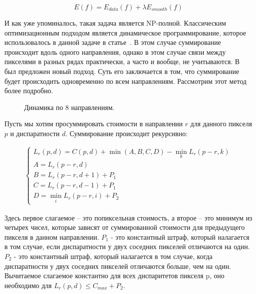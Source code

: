 \begin{equation}
\label{minimization}
E(f) = E_{data}(f) + \lambda  E_{smooth}(f)
\end{equation}

И как уже упоминалось, такая задача является NP-полной. Классическим
оптимизационным подходом является динамическое программирование, которое использовалось в данной задаче в статье~\cite{dp}. В этом случае
суммирование происходит вдоль одного направления, однако в этом случае связи между
пикселями в разных рядах практически, а часто и вообще, не учитываются. В \cite{sgm}  был
предложен новый подход. Суть его заключается в том, что суммирование будет происходить
одновременно по всем направлениям. Рассмотрим этот метод более подробно. 

\begin{figure}[h!]
\caption{Динамика по 8 направлениям.}
\label{pic:5}
\end{figure}

Пусть мы хотим просуммировать стоимости в направлении $r$ для данного пикселя $p$ и
диспаратности $d$. Суммирование происходит рекурсивно: 


\begin{align}
\label{minimization2}
\begin{cases}
L_r(p, d) = C(p, d) + \min (A, B, C, D) - \min\limits_{k}  L_r(p - r, k) \\
A = L_r(p - r, d) \\
B = L_r(p - r, d + 1) + P_1 \\
C = L_r(p - r, d - 1) + P_1 \\
D = \min_{i} L_r(p - r, i) + P_2 
\end{cases}
\end{align}

Здесь первое слагаемое – это попиксельная стоимость, а второе – это минимум из
четырех чисел, которые зависят от суммированной стоимости для предыдущего пикселя в
данном направлении. $P_1$ - это константный штраф, который налагается в том случае, если
диспаратности у двух соседних пикселей отличаются на один. $P_2$ - это константный штраф,
который налагается в том случае, когда диспаратности у двух соседних пикселей отличаются
больше, чем на один. Вычитаемое слагаемое константно для всех диспаритетов пикселя p, оно необходимо для $L_r(p, d) \leq C_{max} + P_2$.

